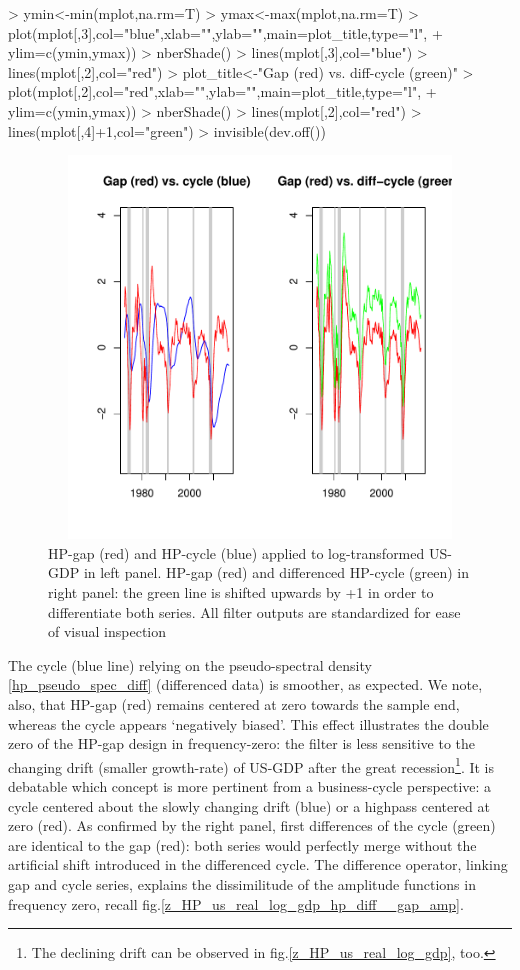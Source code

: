 \documentclass[a4paper]{book}
\begin{document}
\begin{enumerate}
\begin{Schunk}
\begin{Sinput}
> ymin<-min(mplot,na.rm=T)
> ymax<-max(mplot,na.rm=T)
> plot(mplot[,3],col="blue",xlab="",ylab="",main=plot_title,type="l",
+      ylim=c(ymin,ymax))
> nberShade()
> lines(mplot[,3],col="blue")
> lines(mplot[,2],col="red")
> plot_title<-"Gap (red) vs. diff-cycle (green)"
> plot(mplot[,2],col="red",xlab="",ylab="",main=plot_title,type="l",
+      ylim=c(ymin,ymax))
> nberShade()
> lines(mplot[,2],col="red")
> lines(mplot[,4]+1,col="green")
> invisible(dev.off())
\end{Sinput}
\end{Schunk}
\begin{figure}[H]\begin{center}\includegraphics[height=4in, width=6in]{z_HP_us_real_log_gdp_hp_bp}\caption{HP-gap (red) and HP-cycle (blue) applied to log-transformed US-GDP in left panel. HP-gap (red) and differenced HP-cycle (green) in right panel: the green line is shifted upwards by +1 in order to differentiate both series. All filter outputs are standardized for ease of visual inspection\label{z_HP_us_real_log_gdp_hp_bp}}\end{center}\end{figure}The cycle (blue line) relying on the pseudo-spectral density \ref{hp_pseudo_spec_diff} (differenced data) is smoother, as expected. We note, also, that HP-gap (red) remains centered at zero towards the sample end, whereas the cycle appears `negatively biased'. This effect illustrates the double zero of the HP-gap design in frequency-zero: the filter is less sensitive to the changing drift (smaller growth-rate) of US-GDP after the great recession\footnote{The declining drift can be observed in fig.\ref{z_HP_us_real_log_gdp}, too.}. It is debatable which concept is more pertinent from a business-cycle perspective: a cycle centered about the slowly changing drift (blue) or a highpass centered at zero (red). As confirmed by the right panel, first differences of the cycle (green) are identical to the gap (red): both series would perfectly merge without the artificial shift introduced in the differenced cycle. The difference operator, linking gap and cycle series, explains the dissimilitude of the amplitude functions in frequency zero, recall fig.\ref{z_HP_us_real_log_gdp_hp_diff__gap_amp}.  
\end{enumerate}
\end{document}
